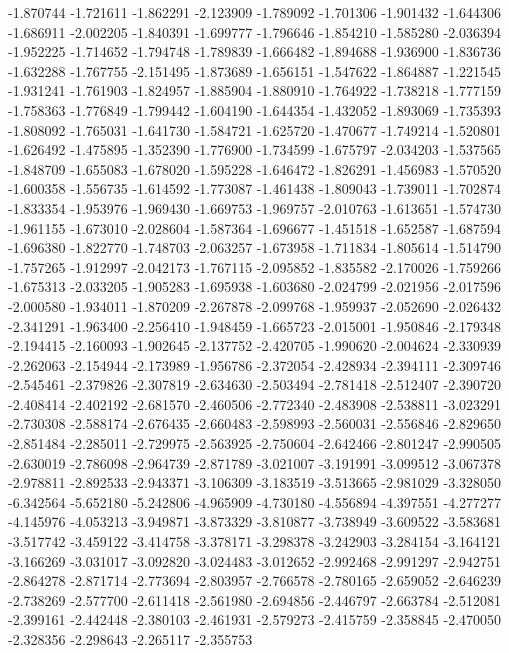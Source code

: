 -1.870744
-1.721611
-1.862291
-2.123909
-1.789092
-1.701306
-1.901432
-1.644306
-1.686911
-2.002205
-1.840391
-1.699777
-1.796646
-1.854210
-1.585280
-2.036394
-1.952225
-1.714652
-1.794748
-1.789839
-1.666482
-1.894688
-1.936900
-1.836736
-1.632288
-1.767755
-2.151495
-1.873689
-1.656151
-1.547622
-1.864887
-1.221545
-1.931241
-1.761903
-1.824957
-1.885904
-1.880910
-1.764922
-1.738218
-1.777159
-1.758363
-1.776849
-1.799442
-1.604190
-1.644354
-1.432052
-1.893069
-1.735393
-1.808092
-1.765031
-1.641730
-1.584721
-1.625720
-1.470677
-1.749214
-1.520801
-1.626492
-1.475895
-1.352390
-1.776900
-1.734599
-1.675797
-2.034203
-1.537565
-1.848709
-1.655083
-1.678020
-1.595228
-1.646472
-1.826291
-1.456983
-1.570520
-1.600358
-1.556735
-1.614592
-1.773087
-1.461438
-1.809043
-1.739011
-1.702874
-1.833354
-1.953976
-1.969430
-1.669753
-1.969757
-2.010763
-1.613651
-1.574730
-1.961155
-1.673010
-2.028604
-1.587364
-1.696677
-1.451518
-1.652587
-1.687594
-1.696380
-1.822770
-1.748703
-2.063257
-1.673958
-1.711834
-1.805614
-1.514790
-1.757265
-1.912997
-2.042173
-1.767115
-2.095852
-1.835582
-2.170026
-1.759266
-1.675313
-2.033205
-1.905283
-1.695938
-1.603680
-2.024799
-2.021956
-2.017596
-2.000580
-1.934011
-1.870209
-2.267878
-2.099768
-1.959937
-2.052690
-2.026432
-2.341291
-1.963400
-2.256410
-1.948459
-1.665723
-2.015001
-1.950846
-2.179348
-2.194415
-2.160093
-1.902645
-2.137752
-2.420705
-1.990620
-2.004624
-2.330939
-2.262063
-2.154944
-2.173989
-1.956786
-2.372054
-2.428934
-2.394111
-2.309746
-2.545461
-2.379826
-2.307819
-2.634630
-2.503494
-2.781418
-2.512407
-2.390720
-2.408414
-2.402192
-2.681570
-2.460506
-2.772340
-2.483908
-2.538811
-3.023291
-2.730308
-2.588174
-2.676435
-2.660483
-2.598993
-2.560031
-2.556846
-2.829650
-2.851484
-2.285011
-2.729975
-2.563925
-2.750604
-2.642466
-2.801247
-2.990505
-2.630019
-2.786098
-2.964739
-2.871789
-3.021007
-3.191991
-3.099512
-3.067378
-2.978811
-2.892533
-2.943371
-3.106309
-3.183519
-3.513665
-2.981029
-3.328050
-6.342564
-5.652180
-5.242806
-4.965909
-4.730180
-4.556894
-4.397551
-4.277277
-4.145976
-4.053213
-3.949871
-3.873329
-3.810877
-3.738949
-3.609522
-3.583681
-3.517742
-3.459122
-3.414758
-3.378171
-3.298378
-3.242903
-3.284154
-3.164121
-3.166269
-3.031017
-3.092820
-3.024483
-3.012652
-2.992468
-2.991297
-2.942751
-2.864278
-2.871714
-2.773694
-2.803957
-2.766578
-2.780165
-2.659052
-2.646239
-2.738269
-2.577700
-2.611418
-2.561980
-2.694856
-2.446797
-2.663784
-2.512081
-2.399161
-2.442448
-2.380103
-2.461931
-2.579273
-2.415759
-2.358845
-2.470050
-2.328356
-2.298643
-2.265117
-2.355753
